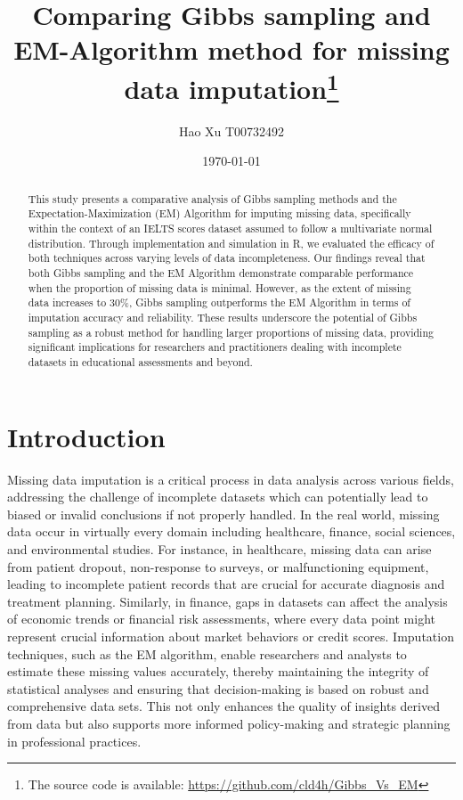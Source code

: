 \documentclass[12pt]{article}
\title{Comparing Gibbs sampling and EM-Algorithm method for missing data imputation\footnote{The source code is available: \url{https://github.com/cld4h/Gibbs_Vs_EM}}}
\author{Hao Xu T00732492}
\date{\today}
\begin{document}
\maketitle

\begin{abstract}

This study presents a comparative analysis of Gibbs sampling methods and the Expectation-Maximization (EM) Algorithm for imputing missing data, specifically within the context of an IELTS scores dataset assumed to follow a multivariate normal distribution. Through implementation and simulation in R, we evaluated the efficacy of both techniques across varying levels of data incompleteness. Our findings reveal that both Gibbs sampling and the EM Algorithm demonstrate comparable performance when the proportion of missing data is minimal. However, as the extent of missing data increases to 30\%, Gibbs sampling outperforms the EM Algorithm in terms of imputation accuracy and reliability. These results underscore the potential of Gibbs sampling as a robust method for handling larger proportions of missing data, providing significant implications for researchers and practitioners dealing with incomplete datasets in educational assessments and beyond.

\end{abstract}

\section{Introduction}

Missing data imputation is a critical process in data analysis across various fields, addressing the challenge of incomplete datasets which can potentially lead to biased or invalid conclusions if not properly handled. In the real world, missing data occur in virtually every domain including healthcare, finance, social sciences, and environmental studies. For instance, in healthcare, missing data can arise from patient dropout, non-response to surveys, or malfunctioning equipment, leading to incomplete patient records that are crucial for accurate diagnosis and treatment planning. Similarly, in finance, gaps in datasets can affect the analysis of economic trends or financial risk assessments, where every data point might represent crucial information about market behaviors or credit scores. Imputation techniques, such as the EM algorithm, enable researchers and analysts to estimate these missing values accurately, thereby maintaining the integrity of statistical analyses and ensuring that decision-making is based on robust and comprehensive data sets. This not only enhances the quality of insights derived from data but also supports more informed policy-making and strategic planning in professional practices.
\end{document}
